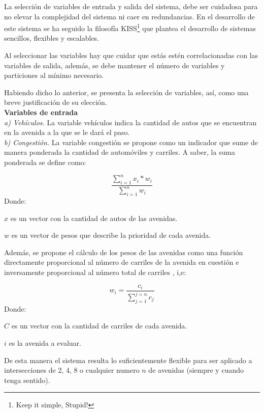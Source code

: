 La selección de variables de entrada y salida del sistema, debe ser cuidadosa para no elevar la complejidad del sistema ni caer en redundancias. En el desarrollo de este sistema se ha seguido la filosofía KISS\footnote{Keep it simple, Stupid!} que plantea el desarrollo de sistemas sencillos, flexibles y escalables.

Al seleccionar las variables hay que cuidar que estás estén correlacionadas con las variables de salida, además, se debe mantener el número de variables y particiones al mínimo necesario.

Habiendo dicho lo anterior, se presenta la selección de variables, así, como una breve justificación de su elección. \\

\textbf{Variables de entrada}\\
\textit{a) Vehículos.} La variable vehículos indica la cantidad de autos que se encuentran en la avenida a la que se le dará el paso.\\
\textit{b) Congestión.} La variable congestión se propone como un indicador que sume de manera ponderada la cantidad de automóviles y carriles. A saber, la suma ponderada se define como:

\begin{displaymath}
\frac{\sum_{i=1}^{n} x_i * w_i}{\sum_{i=1}^{n} w_i}
\end{displaymath}
Donde:

{\setlength{\baselineskip}{0.7\baselineskip}\begin{description}
	\item $x$ es un vector con la cantidad de autos de las avenidas.
	\item $w$ es un vector de pesos que describe la prioridad de cada avenida.
\end{description}}

Además, se propone el cálculo de los pesos de las avenidas como una función directamente proporcional al número de carriles de la avenida en cuestión e inversamente proporcional al número total de carriles , i,e:

\begin{displaymath}
w_i = \frac{ c_i }{\sum_{j=1}^{j=n} c_j}
\end{displaymath}
Donde:
{\setlength{\baselineskip}{0.7\baselineskip}\begin{description}
		\item $C$ es un vector con la cantidad de carriles de cada avenida.
		\item $i$ es la avenida a evaluar.
\end{description}}
De esta manera el sistema resulta lo suficientemente flexible para ser aplicado a intersecciones de 2, 4, 8 o cualquier numero $n$ de avenidas (siempre y cuando tenga sentido).\\

